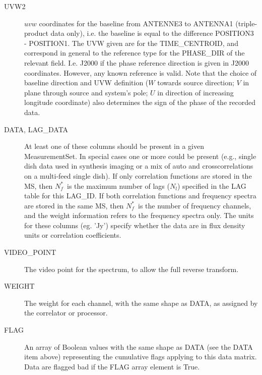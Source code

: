 \documentclass{article}
\newcommand{\nfs}{$N_f^*$}
\newcommand{\nl}{$N_l$}
\begin{document}
\begin{description}
\item[UVW2] $uvw$ coordinates for the baseline from ANTENNE3 to ANTENNA1
   (triple-product data only), i.e. the
   baseline is equal to the difference POSITION3 - POSITION1. The UVW given
   are for the TIME\_CENTROID, and correspond in general to the reference type
   for the PHASE\_DIR of the relevant field. I.e. J2000 if the phase reference
   direction is given in J2000 coordinates. However, any known reference is
   valid.
   Note that the choice of baseline direction and UVW definition ($W$ towards
   source direction; $V$ in plane through source and system's pole; $U$ in
   direction of increasing longitude coordinate) also determines the sign of
   the phase of the recorded data.

\item[DATA,  LAG\_DATA] At least one of these columns
should be present in a given MeasurementSet. In special cases one or
more could be present (e.g., single dish data used in synthesis
imaging or a mix of auto and crosscorrelations on a multi-feed single
dish). If only correlation functions are stored in the MS, then \nfs\
is the maximum number of lags (\nl) specified in the LAG table for
this LAG\_ID.  If both correlation functions and frequency spectra are
stored in the same MS, then \nfs\ is the number of frequency channels,
and the weight information refers to the frequency spectra only. The
units for these columns (eg. 'Jy') specify whether the data are in
flux density units or correlation coefficients.

\item[VIDEO\_POINT] The video point for the spectrum, to allow the
full reverse transform.

\item[WEIGHT] The weight for each channel, with the same shape as DATA,
 as assigned by the correlator or processor.

\item[FLAG] An array of Boolean values with the same shape as DATA
(see the DATA item above) representing the cumulative flags applying
to this data matrix. Data are flagged
bad if the FLAG array element is True.


\end{description}
\end{document}

